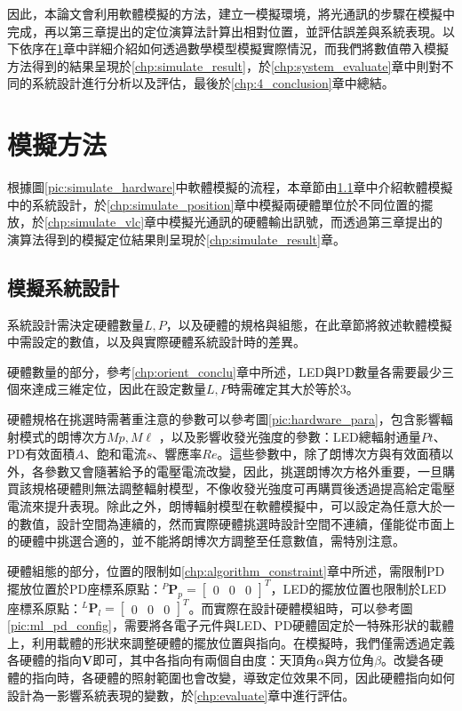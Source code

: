 因此，本論文會利用軟體模擬的方法，建立一模擬環境，將光通訊的步驟在模擬中完成，再以第三章提出的定位演算法計算出相對位置，並評估誤差與系統表現。以下依序在\ref{chp:simulation}章中詳細介紹如何透過數學模型模擬實際情況，而我們將數值帶入模擬方法得到的結果呈現於\ref{chp:simulate_result}，於\ref{chp:system_evaluate}章中則對不同的系統設計進行分析以及評估，最後於\ref{chp:4_conclusion}章中總結。


\section{模擬方法}
\label{chp:simulation}

根據圖\ref{pic:simulate_hardware}中軟體模擬的流程，本章節由\ref{chp:system_design}章中介紹軟體模擬中的系統設計，於\ref{chp:simulate_position}章中模擬兩硬體單位於不同位置的擺放，於\ref{chp:simulate_vlc}章中模擬光通訊的硬體輸出訊號，而透過第三章提出的演算法得到的模擬定位結果則呈現於\ref{chp:simulate_result}章。




\subsection{模擬系統設計}
\label{chp:system_design}

系統設計需決定硬體數量$L,P$，以及硬體的規格與組態，在此章節將敘述軟體模擬中需設定的數值，以及與實際硬體系統設計時的差異。

硬體數量的部分，參考\ref{chp:orient_conclu}章中所述，LED與PD數量各需要最少三個來達成三維定位，因此在設定數量$L,P$時需確定其大於等於3。

硬體規格在挑選時需著重注意的參數可以參考圖\ref{pic:hardware_para}，包含影響輻射模式的朗博次方$Mp,M\ell$
，以及影響收發光強度的參數：LED總輻射通量$Pt$、PD有效面積$A$、飽和電流$s$、響應率$Re$。這些參數中，除了朗博次方與有效面積以外，各參數又會隨著給予的電壓電流改變，因此，挑選朗博次方格外重要，一旦購買該規格硬體則無法調整輻射模型，不像收發光強度可再購買後透過提高給定電壓電流來提升表現。除此之外，朗博輻射模型在軟體模擬中，可以設定為任意大於一的數值，設計空間為連續的，然而實際硬體挑選時設計空間不連續，僅能從市面上的硬體中挑選合適的，並不能將朗博次方調整至任意數值，需特別注意。

硬體組態的部分，位置的限制如\ref{chp:algorithm_constraint}章中所述，需限制PD擺放位置於PD座標系原點：$^P\boldsymbol{P}_p=
\left[\begin{array}{ccc}0&0&0\end{array}\right]^T$，LED的擺放位置也限制於LED座標系原點：$^L\boldsymbol{P}_l=
\left[\begin{array}{ccc}0&0&0\end{array}\right]^T$。而實際在設計硬體模組時，可以參考圖\ref{pic:ml_pd_config}，需要將各電子元件與LED、PD硬體固定於一特殊形狀的載體上，利用載體的形狀來調整硬體的擺放位置與指向。在模擬時，我們僅需透過定義各硬體的指向$\boldsymbol{V}$即可，其中各指向有兩個自由度：天頂角$\alpha$與方位角$\beta$。改變各硬體的指向時，各硬體的照射範圍也會改變，導致定位效果不同，因此硬體指向如何設計為一影響系統表現的變數，於\ref{chp:evaluate}章中進行評估。




